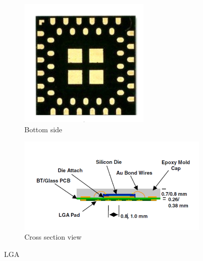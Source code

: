 \documentclass[final]{cubedoc}
\begin{document}
\begin{figure}[h!]
\centering
\begin{subfigure}{.5\textwidth}
  \centering
  \includegraphics[keepaspectratio, width=0.7\linewidth]{docs/lga.png}
  \caption{Bottom side}
  \label{fig:sub1}
\end{subfigure}%
\begin{subfigure}{.5\textwidth}
  \centering
  \includegraphics[keepaspectratio, width=1.2\linewidth, height=.4\textheight]{docs/lga_cross.png}
  \caption{Cross section view}
  \label{fig:sub2}
\end{subfigure}
\caption{LGA}
\label{fig:test}
\end{figure}


\end{document}
